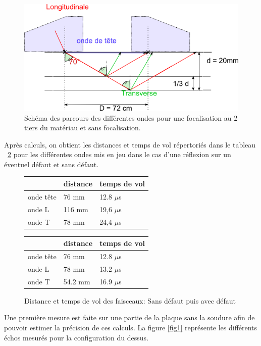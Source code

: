 \documentclass[twoside]{article}
\begin{document}
\begin{multicols}{2}
\bigskip
\begin{figure}[H]
\centering
\includegraphics[scale=0.5]{./images/faiseaux.png}
\caption{\label{schema2} Schéma des parcours des différentes ondes pour une focalisation au 2 tiers du matériau et sans focalisation.}
\end{figure}

Après calculs, on obtient les distances et temps de vol répertoriés dans le tableau ~\ref{tab2} pour les différentes ondes mis en jeu dans le cas d'une réflexion sur un éventuel défaut et sans défaut.
\bigskip


\begin{figure}[H]
\begin{tabular}{l|l|l}
~ & distance & temps de vol \\ \hline
onde tête &76 mm &  12.8 $\mu$s \\
onde L &116 mm & 19,6 $\mu$s \\
onde T &78 mm & 24,4 $\mu$s \\ \hline \hline
\end{tabular}

\begin{tabular}{l|l|l}
~ & distance & temps de vol \\ \hline
onde tête &76 mm &  12.8 $\mu$s \\
onde L & 78 mm & 13.2 $\mu$s \\
onde T & 54.2 mm & 16.9 $\mu$s
\end{tabular}

\caption{\label{tab2} Distance et temps de vol des faisceaux: Sans défaut puis avec défaut}
\end{figure}

Une première mesure est faite sur une partie de la plaque sans la soudure afin de pouvoir estimer la précision	 de ces calculs. La figure \ref{fig1} représente les différents échos mesurés pour la configuration du dessus.


\end{multicols}
\end{document}
